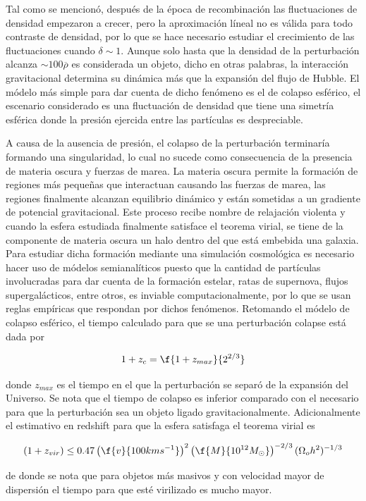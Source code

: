 Tal como se mencionó, después de la época de recombinación las fluctuaciones de 
densidad empezaron a crecer, pero la aproximación líneal no es válida para todo
contraste de densidad, por lo que se hace necesario estudiar el crecimiento de
las fluctuaciones cuando $\delta\sim 1$. Aunque solo hasta que la densidad de la 
perturbación alcanza $\sim 100 \overline{\rho}$ es considerada un objeto, dicho en 
otras palabras, la interacción gravitacional determina su dinámica más que la expansión
del flujo de Hubble. El módelo más simple para dar cuenta de dicho fenómeno es 
el de colapso esférico, el escenario considerado es una fluctuación de densidad
que tiene una simetría esférica donde la presión ejercida entre las partículas 
es despreciable. 

A causa de la ausencia de presión, el colapso de la perturbación terminaría 
formando una singularidad, lo cual no sucede como consecuencia
de la presencia de materia oscura y fuerzas de marea. 
La materia oscura permite la formación de regiones más pequeñas
que in\-te\-rac\-tuan causando las fuerzas de marea, 
las regiones finalmente alcanzan equilibrio dinámico y están sometidas 
a un gradiente de potencial gravitacional.
Este proceso recibe nombre de relajación violenta 
y cuando la esfera estudiada finalmente satisface el teorema virial, 
se tiene de la componente de materia oscura un halo dentro del que está embebida 
una galaxia.
Para estudiar dicha formación mediante una simulación cosmológica es necesario hacer 
uso de módelos semianalíticos puesto que la cantidad de partículas involucradas
para dar cuenta de la formación estelar, ratas de supernova, flujos supergalácticos,
entre otros, es inviable computacionalmente, por lo que se usan reglas empíricas
que respondan por dichos fenómenos. 
Retomando el módelo de colapso esférico, el tiempo calculado para que se una 
perturbación colapse está dada por 

\[
1+z_c = \f{1+z_{max}}{2^{2/3}}
\]

donde $z_{max}$ es el tiempo en el que la perturbación se separó de la expansión del Universo. Se nota
que el tiempo de colapso es inferior comparado con el necesario para que la perturbación 
sea un objeto ligado gravitacionalmente. Adicionalmente el estimativo en redshift para que la 
esfera satisfaga el teorema virial es

\[
(1+z_{vir})\leq 0.47\left( \f{v}{100kms^{-1}}\right)^2\left( \f{M}{10^{12}M_{\odot}}\right)^{-2/3}(\Omega_oh^2)^{-1/3}
\]

de donde se nota que para objetos más masivos y con velocidad mayor de dispersión 
el tiempo para que esté virilizado es mucho mayor. 

